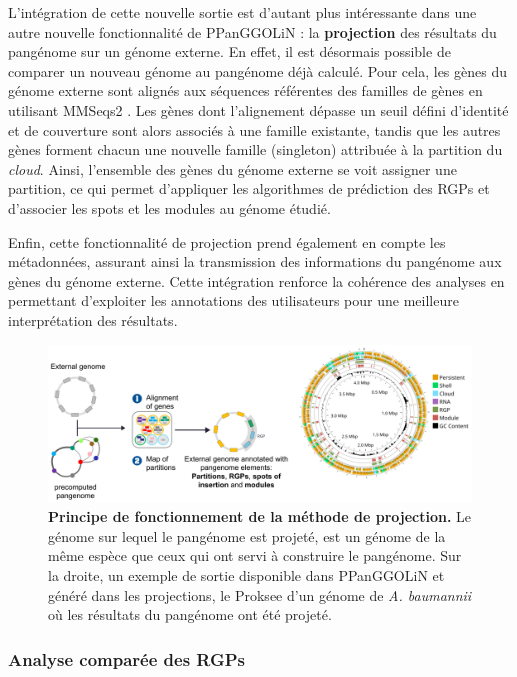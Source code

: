 \newpage
L'intégration de cette nouvelle sortie est d'autant plus intéressante dans une autre nouvelle fonctionnalité de PPanGGOLiN : la \textbf{projection} des résultats du pangénome sur un génome externe. En effet, il est désormais possible de comparer un nouveau génome au pangénome déjà calculé. Pour cela, les gènes du génome externe sont alignés aux séquences référentes des familles de gènes en utilisant MMSeqs2 \cite{steinegger_mmseqs2_2017}. Les gènes dont l'alignement dépasse un seuil défini d'identité et de couverture sont alors associés à une famille existante, tandis que les autres gènes forment chacun une nouvelle famille (singleton) attribuée à la partition du \textit{cloud}. Ainsi, l’ensemble des gènes du génome externe se voit assigner une partition, ce qui permet d’appliquer les algorithmes de prédiction des RGPs et d’associer les spots et les modules au génome étudié.

Enfin, cette fonctionnalité de projection prend également en compte les métadonnées, assurant ainsi la transmission des informations du pangénome aux gènes du génome externe. Cette intégration renforce la cohérence des analyses en permettant d’exploiter les annotations des utilisateurs pour une meilleure interprétation des résultats.

\begin{figure}[htbp]
    \centering
    \includegraphics[width=\linewidth]{images/projection.png}
    \caption[Principe de fonctionnement de la méthode de projection]{\textbf{Principe de fonctionnement de la méthode de projection.} Le génome sur lequel le pangénome est projeté, est un génome de la même espèce que ceux qui ont servi à construire le pangénome. Sur la droite, un exemple de sortie disponible dans PPanGGOLiN et généré dans les projections, le Proksee \cite{grant_proksee_2023} d'un génome de \textit{A. baumannii} où les résultats du pangénome ont été projeté.}
    \label{fig:projection}
\end{figure}

\subsubsection{Analyse comparée des RGPs}

